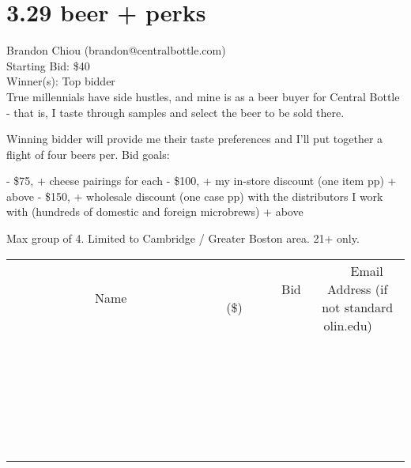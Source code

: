 \documentclass[11pt]{article}
\begin{document}
\section*{3.29 beer + perks}
Brandon Chiou (brandon@centralbottle.com) \\
Starting Bid: \$40 \\
Winner(s): 
Top bidder \\
True millennials have side hustles, and mine is as a beer buyer for Central Bottle - that is, I taste through samples and select the beer to be sold there.

Winning bidder will provide me their taste preferences and I'll put together a flight of four beers per. Bid goals:

- \$75, + cheese pairings for each
- \$100, + my in-store discount (one item pp) + above
- \$150, + wholesale discount (one case pp) with the distributors I work with (hundreds of domestic and foreign microbrews) + above

Max group of 4. Limited to Cambridge / Greater Boston area. 21+ only. \\[6ex]
\begin{tabular}{c c c}
~~~~~~~~~~~~~Name~~~~~~~~~~~~~ & ~~~~~~~~~Bid (\$)~~~~~~~~~ & ~~~Email Address (if not standard olin.edu)~~~ \\
 & & \\
\hline
 & & \\
\hline
 & & \\
\hline
 & & \\
\hline
 & & \\
\hline
 & & \\
\hline
 & & \\
\hline
 & & \\
\hline
 & & \\
\hline
 & & \\
\hline
 & & \\
\hline
 & & \\
\hline
 & & \\
\hline
 & & \\
\hline
 & & \\
\hline
 & & \\
\hline
 & & \\
\hline
 & & \\
\hline
 & & \\
\hline
 & & \\
\hline
 & & \\
\hline
 & & \\
\hline
 & & \\
\hline
 & & \\
\hline
 & & \\
\hline
 & & \\
\hline
\end{tabular}
\clearpage
\end{document}

